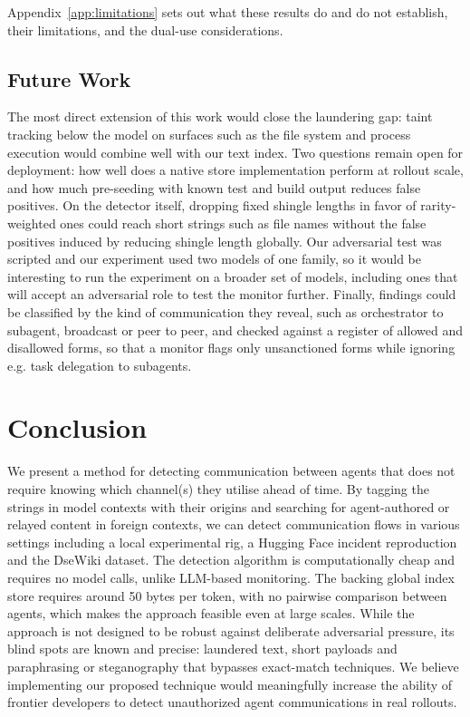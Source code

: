 \documentclass[11pt,a4paper]{article}
\begin{document}
Appendix~\ref{app:limitations} sets out what these results do and do not establish, their limitations, and the dual-use considerations.

\subsection{Future Work}

The most direct extension of this work would close the laundering gap: taint tracking below the model on surfaces such as the file system and process execution would combine well with our text index. Two questions remain open for deployment: how well does a native store implementation perform at rollout scale, and how much pre-seeding with known test and build output reduces false positives. On the detector itself, dropping fixed shingle lengths in favor of rarity-weighted ones could reach short strings such as file names without the false positives induced by reducing shingle length globally. Our adversarial test was scripted and our experiment used two models of one family, so it would be interesting to run the experiment on a broader set of models, including ones that will accept an adversarial role to test the monitor further. Finally, findings could be classified by the kind of communication they reveal, such as orchestrator to subagent, broadcast or peer to peer, and checked against a register of allowed and disallowed forms, so that a monitor flags only unsanctioned forms while ignoring e.g. task delegation to subagents.

\section{Conclusion}

We present a method for detecting communication between agents that does not require knowing which channel(s) they utilise ahead of time. By tagging the strings in model contexts with their origins and searching for agent-authored or relayed content in foreign contexts, we can detect communication flows in various settings including a local experimental rig, a Hugging Face incident reproduction and the DseWiki dataset. The detection algorithm is computationally cheap and requires no model calls, unlike LLM-based monitoring. The backing global index store requires around 50 bytes per token, with no pairwise comparison between agents, which makes the approach feasible even at large scales. While the approach is not designed to be robust against deliberate adversarial pressure, its blind spots are known and precise: laundered text, short payloads and paraphrasing or steganography that bypasses exact-match techniques. We believe implementing our proposed technique would meaningfully increase the ability of frontier developers to detect unauthorized agent communications in real rollouts.
\end{document}
